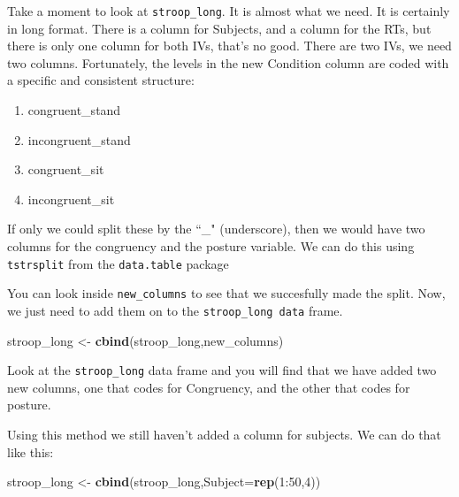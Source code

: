 \documentclass[]{book}
\newenvironment{Shaded}{\begin{snugshade}}{\end{snugshade}}
\newcommand{\KeywordTok}[1]{\textcolor[rgb]{0.13,0.29,0.53}{\textbf{{#1}}}}
\newcommand{\DataTypeTok}[1]{\textcolor[rgb]{0.13,0.29,0.53}{{#1}}}
\newcommand{\DecValTok}[1]{\textcolor[rgb]{0.00,0.00,0.81}{{#1}}}
\newcommand{\StringTok}[1]{\textcolor[rgb]{0.31,0.60,0.02}{{#1}}}
\newcommand{\NormalTok}[1]{{#1}}
\providecommand{\tightlist}{%
  \setlength{\itemsep}{0pt}\setlength{\parskip}{0pt}}
\theoremstyle{definition}
\theoremstyle{definition}
\theoremstyle{definition}
\theoremstyle{remark}
\begin{document}
Take a moment to look at \texttt{stroop\_long}. It is almost what we
need. It is certainly in long format. There is a column for Subjects,
and a column for the RTs, but there is only one column for both IVs,
that's no good. There are two IVs, we need two columns. Fortunately, the
levels in the new Condition column are coded with a specific and
consistent structure:

\begin{enumerate}
\def\labelenumi{\arabic{enumi}.}
\tightlist
\item
  congruent\_stand
\item
  incongruent\_stand
\item
  congruent\_sit
\item
  incongruent\_sit
\end{enumerate}

If only we could split these by the ``\_" (underscore), then we would
have two columns for the congruency and the posture variable. We can do
this using \texttt{tstrsplit} from the \texttt{data.table} package

\begin{Shaded}
\end{Shaded}

You can look inside \texttt{new\_columns} to see that we succesfully
made the split. Now, we just need to add them on to the
\texttt{stroop\_long\ data} frame.

\begin{Shaded}
\begin{Highlighting}[]
\NormalTok{stroop_long <-}\StringTok{ }\KeywordTok{cbind}\NormalTok{(stroop_long,new_columns)}
\end{Highlighting}
\end{Shaded}

Look at the \texttt{stroop\_long} data frame and you will find that we
have added two new columns, one that codes for Congruency, and the other
that codes for posture.

Using this method we still haven't added a column for subjects. We can
do that like this:

\begin{Shaded}
\begin{Highlighting}[]
\NormalTok{stroop_long <-}\StringTok{ }\KeywordTok{cbind}\NormalTok{(stroop_long,}\DataTypeTok{Subject=}\KeywordTok{rep}\NormalTok{(}\DecValTok{1}\NormalTok{:}\DecValTok{50}\NormalTok{,}\DecValTok{4}\NormalTok{))}
\end{Highlighting}
\end{Shaded}
\end{document}
